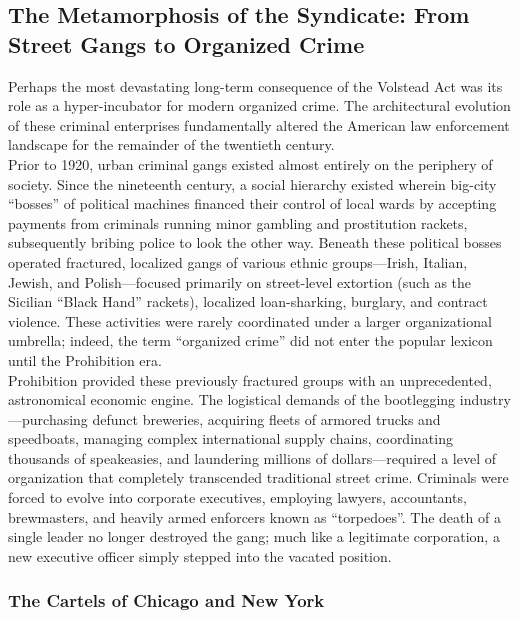 \documentclass[
]{article}
\begin{document}
\subsection{\texorpdfstring{\textbf{The Metamorphosis of the Syndicate:
From Street Gangs to Organized
Crime}}{The Metamorphosis of the Syndicate: From Street Gangs to Organized Crime}}\label{the-metamorphosis-of-the-syndicate-from-street-gangs-to-organized-crime}

Perhaps the most devastating long-term consequence of the Volstead Act
was its role as a hyper-incubator for modern organized crime. The
architectural evolution of these criminal enterprises fundamentally
altered the American law enforcement landscape for the remainder of the
twentieth century.\\
Prior to 1920, urban criminal gangs existed almost entirely on the
periphery of society. Since the nineteenth century, a social hierarchy
existed wherein big-city ``bosses'' of political machines financed their
control of local wards by accepting payments from criminals running
minor gambling and prostitution rackets, subsequently bribing police to
look the other way. Beneath these political bosses operated fractured,
localized gangs of various ethnic groups---Irish, Italian, Jewish, and
Polish---focused primarily on street-level extortion (such as the
Sicilian ``Black Hand'' rackets), localized loan-sharking, burglary, and
contract violence. These activities were rarely coordinated under a
larger organizational umbrella; indeed, the term ``organized crime'' did
not enter the popular lexicon until the Prohibition era.\\
Prohibition provided these previously fractured groups with an
unprecedented, astronomical economic engine. The logistical demands of
the bootlegging industry---purchasing defunct breweries, acquiring
fleets of armored trucks and speedboats, managing complex international
supply chains, coordinating thousands of speakeasies, and laundering
millions of dollars---required a level of organization that completely
transcended traditional street crime. Criminals were forced to evolve
into corporate executives, employing lawyers, accountants, brewmasters,
and heavily armed enforcers known as ``torpedoes''. The death of a
single leader no longer destroyed the gang; much like a legitimate
corporation, a new executive officer simply stepped into the vacated
position.

\subsubsection{\texorpdfstring{\textbf{The Cartels of Chicago and New
York}}{The Cartels of Chicago and New York}}\label{the-cartels-of-chicago-and-new-york}
\end{document}
